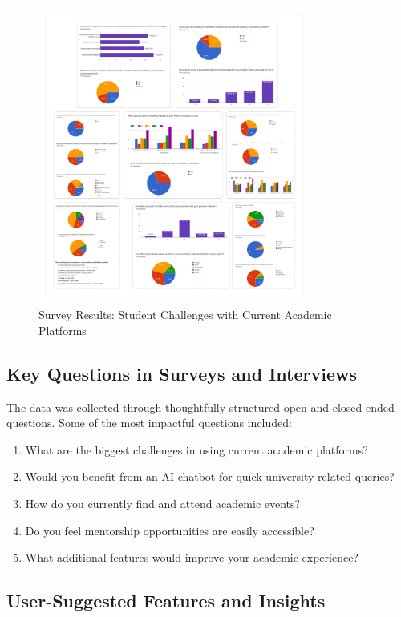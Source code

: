 \begin{figure}[h]
    \centering
    \includegraphics[width=0.8\textwidth]{images/survey_chart.png}
    \caption{Survey Results: Student Challenges with Current Academic Platforms}
    \label{fig:survey_chart}
\end{figure}

\subsection*{Key Questions in Surveys and Interviews}

The data was collected through thoughtfully structured open and closed-ended questions. Some of the most impactful questions included:

\begin{enumerate}
\item What are the biggest challenges in using current academic platforms?
\item Would you benefit from an AI chatbot for quick university-related queries?
\item How do you currently find and attend academic events?
\item Do you feel mentorship opportunities are easily accessible?
\item What additional features would improve your academic experience?
\end{enumerate}

\subsection*{User-Suggested Features and Insights}

